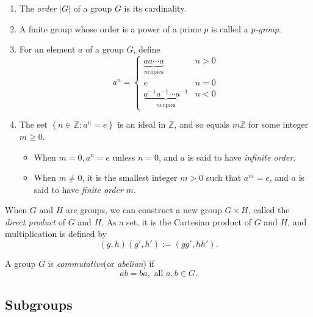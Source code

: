 \begin{definition}
  \label{definition-order}
  \label{definition-p-group}
  \begin{enumerate}
    \item The \emph{order} \( \left\vert G \right\vert \) of a group \( G \) is its cardinality.
    \item A finite group whose order is a power of a prime \( p \) is called a \emph{\( p \)-group}.
    \item For an element \( a \) of a group \( G \), define
      \[
        a^n = \begin{cases}
          \underbrace{a a \cdots a}_{n \text{copies}} & n > 0\\
          e & n = 0\\ 
          \underbrace{a^{-1} a^{-1} \cdots a^{-1}}_{n \text{copies}} & n < 0
        \end{cases}
      \]
    \item The set \( \left\lbrace n \in \mathbb{Z}: a^n = e \right\rbrace \) is an ideal in \( \mathbb{Z} \), and so equals \( m \mathbb{Z} \) for some integer \( m \geq 0 \).
      \begin{itemize}
        \item When \( m = 0, a^n = e  \) unless \( n = 0 \), and \( a \) is said to have \emph{infinite order}.
        \item When \( m \neq 0 \), it is the smallest integer \( m > 0 \) such that \( a^m = e \), and \( a \) is said to have \emph{finite order} \( m \).
      \end{itemize}
  \end{enumerate}
\end{definition}

\begin{definition}
  \label{definition-direct-product}
  When \( G \) and \( H \) are  groups, we can construct a new group \( G \times H \), called the \emph{direct product} of \( G \) and \( H \).
  As a set, it is the Cartesian product of \( G \) and \( H \), and multiplication is defined by
  \[
    (g, h)(g', h') := (gg', hh').
  \]
\end{definition}

\begin{definition}
  \label{definition-commutative-group}
  A group \( G \) is \emph{commutative}(or \emph{abelian}) if
  \[
    ab = ba, \text{ all } a, b \in G.
  \]
\end{definition}

\subsection{Subgroups}
\label{subsection-subgroups}


